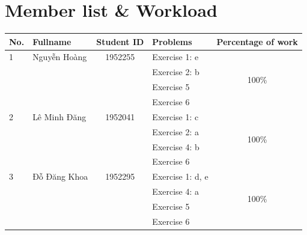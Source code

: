 \documentclass[a4paper]{article}
\numberwithin{equation}{section}
\begin{document}

\newpage
\tableofcontents
\newpage


\section*{Member list \& Workload}
\begin{center}
  \begin{tabular}{llclc}
    \toprule
    \textbf{No.} & \textbf{Fullname} & \textbf{Student ID} & \textbf{Problems} & \textbf{Percentage of work} \\
    \midrule
    1            & Nguyễn Hoàng      & 1952255             & Exercise 1: e     & \multirow{4}{*}{100\%}      \\
                 &                   &                     & Exercise 2: b     &                             \\
                 &                   &                     & Exercise 5        &                             \\
                 &                   &                     & Exercise 6        &                             \\
    \midrule
    2            & Lê Minh Đăng      & 1952041             & Exercise 1: c     & \multirow{4}{*}{100\%}      \\
                 &                   &                     & Exercise 2: a     &                             \\
                 &                   &                     & Exercise 4: b     &                             \\
                 &                   &                     & Exercise 6        &                             \\
    \midrule
    3            & Đỗ Đăng Khoa      & 1952295             & Exercise 1: d, e  & \multirow{4}{*}{100\%}      \\
                 &                   &                     & Exercise 4: a     &                             \\
                 &                   &                     & Exercise 5        &                             \\
                 &                   &                     & Exercise 6        &                             \\
    \bottomrule
  \end{tabular}
\end{center}
\end{document}
